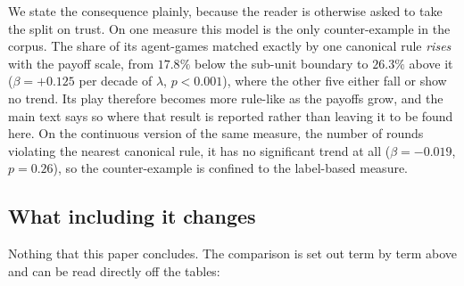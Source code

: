 \documentclass[11pt,a4paper]{article}
\newcommand{\lam}{\lambda}
\begin{document}
We state the consequence plainly, because the reader is otherwise asked to take
the split on trust. On one measure this model is the only counter-example in the
corpus. The share of its agent-games matched exactly by one canonical rule
\emph{rises} with the payoff scale, from $17.8\%$ below the sub-unit boundary to
$26.3\%$ above it ($\beta = +0.125$ per decade of $\lam$, $p < 0.001$), where
the other five either fall or show no trend. Its play therefore becomes more
rule-like as the payoffs grow, and the main text says so where that result is
reported rather than leaving it to be found here. On the continuous version of
the same measure, the number of rounds violating the nearest canonical rule, it
has no significant trend at all ($\beta = -0.019$, $p = 0.26$), so the
counter-example is confined to the label-based measure.

\subsection{What including it changes}

Nothing that this paper concludes. The comparison is set out term by term
above and can be read directly off the tables:
\end{document}
